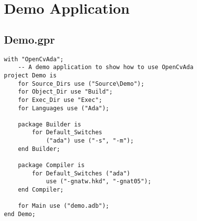 \chapter{Demo Application}
\section{Demo.gpr}
\begin{lstlisting}
with "OpenCvAda";
	-- A demo application to show how to use OpenCvAda
project Demo is
	for Source_Dirs use ("Source\Demo");
	for Object_Dir use "Build";
	for Exec_Dir use "Exec";
	for Languages use ("Ada");

	package Builder is
		for Default_Switches 
			("ada") use ("-s", "-m");
	end Builder;

	package Compiler is
		for Default_Switches ("ada") 
			use ("-gnatw.hkd", "-gnat05");
	end Compiler;

	for Main use ("demo.adb");
end Demo;
\end{lstlisting}
